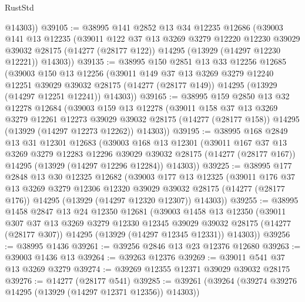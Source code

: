 \begin{lexlean}{RustStd}
\begin{coremodule}
        @14303))
@39105 := @38995
    @141
    @2852
    @13
    @34
    @12235
    @12686
    (@39003
      @141
      @13
      @12235
      (@39011
        @122
        @37
        @13
        @3269
        @3279
        @12220
        @12230
        @39029
        @39032
        @28175
        (@14277 (@28177 @122))
        @14295
        (@13929 (@14297 @12230 @12221))
        @14303))
@39135 := @38995
    @150
    @2851
    @13
    @33
    @12256
    @12685
    (@39003
      @150
      @13
      @12256
      (@39011
        @149
        @37
        @13
        @3269
        @3279
        @12240
        @12251
        @39029
        @39032
        @28175
        (@14277 (@28177 @149))
        @14295
        (@13929 (@14297 @12251 @12241))
        @14303))
@39165 := @38995
    @159
    @2850
    @13
    @32
    @12278
    @12684
    (@39003
      @159
      @13
      @12278
      (@39011
        @158
        @37
        @13
        @3269
        @3279
        @12261
        @12273
        @39029
        @39032
        @28175
        (@14277 (@28177 @158))
        @14295
        (@13929 (@14297 @12273 @12262))
        @14303))
@39195 := @38995
    @168
    @2849
    @13
    @31
    @12301
    @12683
    (@39003
      @168
      @13
      @12301
      (@39011
        @167
        @37
        @13
        @3269
        @3279
        @12283
        @12296
        @39029
        @39032
        @28175
        (@14277 (@28177 @167))
        @14295
        (@13929 (@14297 @12296 @12284))
        @14303))
@39225 := @38995
    @177
    @2848
    @13
    @30
    @12325
    @12682
    (@39003
      @177
      @13
      @12325
      (@39011
        @176
        @37
        @13
        @3269
        @3279
        @12306
        @12320
        @39029
        @39032
        @28175
        (@14277 (@28177 @176))
        @14295
        (@13929 (@14297 @12320 @12307))
        @14303))
@39255 := @38995
    @1458
    @2847
    @13
    @24
    @12350
    @12681
    (@39003
      @1458
      @13
      @12350
      (@39011
        @307
        @37
        @13
        @3269
        @3279
        @12330
        @12345
        @39029
        @39032
        @28175
        (@14277 (@28177 @307))
        @14295
        (@13929 (@14297 @12345 @12331))
        @14303))
@39256 := @38995 @1436
@39261 := @39256 @2846 @13 @23 @12376 @12680
@39263 := @39003 @1436 @13
@39264 := @39263 @12376
@39269 := @39011 @541 @37 @13 @3269 @3279
@39274 := @39269 @12355 @12371 @39029 @39032 @28175
@39276 := @14277 (@28177 @541)
@39285 := @39261 (@39264 (@39274 @39276 @14295 (@13929 (@14297 @12371 @12356)) @14303))

\end{coremodule}
\end{lexlean}
